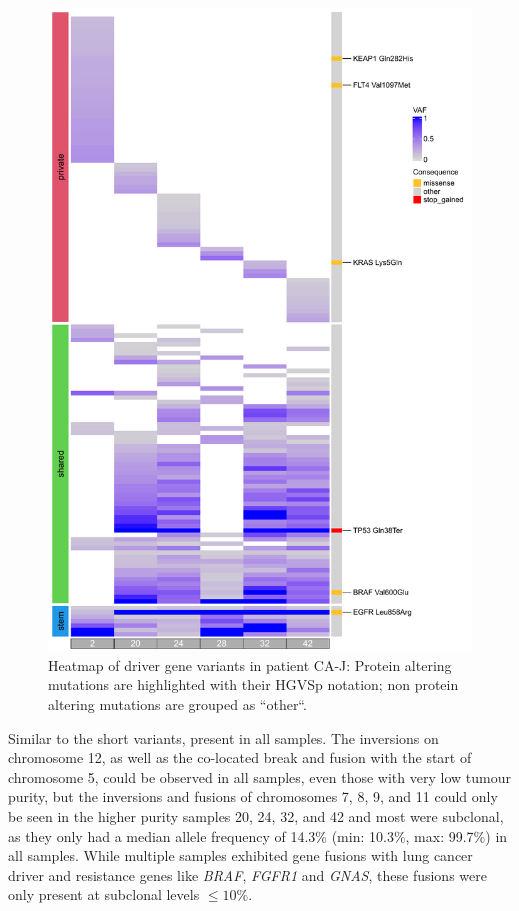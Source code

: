 \begin{figure}[htp]
\centering
\includegraphics[width=.99\linewidth]{Figures/CASCADE/CA80/CA80varHeatmap.pdf}
\caption[Heatmap of driver gene variants in patient CA-J]{Heatmap of driver gene variants in patient CA-J: Protein altering mutations are highlighted with their HGVSp notation; non protein altering mutations are grouped as ``other``.} \label{fig:ca80heatmap}
\end{figure}


Similar to the short variants,  present in all samples. The inversions on chromosome 12, as well as the co-located break and fusion with the start of chromosome 5, could be observed in all samples, even those with very low tumour purity, but the inversions and fusions of chromosomes 7, 8, 9, and 11 could only be seen in the higher purity samples 20, 24, 32, and 42 and most were subclonal, as they only had a median allele frequency of 14.3\% (min: 10.3\%, max: 99.7\%) in all samples.
While multiple samples exhibited gene fusions with lung cancer driver and resistance genes like \textit{BRAF}, \textit{FGFR1} and \textit{GNAS}, these fusions were only present at subclonal levels $\leq 10\%$.


